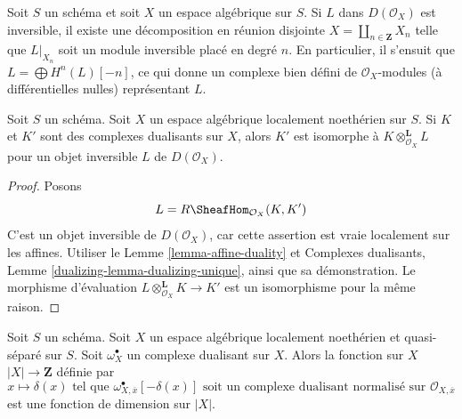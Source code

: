 \medskip\noindent
Soit $S$ un schéma et soit $X$ un espace algébrique sur $S$.
Si $L$ dans $D(\mathcal{O}_X)$ est inversible, il existe une
décomposition en réunion disjointe $X = \coprod_{n \in \mathbf{Z}} X_n$
telle que $L|_{X_n}$ soit un module inversible placé en degré $n$.
En particulier, il s'ensuit que $L = \bigoplus H^n(L)[-n]$,
ce qui donne un complexe bien défini de $\mathcal{O}_X$-modules
(à différentielles nulles) représentant $L$.

\begin{lemma}
\label{lemma-dualizing-unique-spaces}
Soit $S$ un schéma.
Soit $X$ un espace algébrique localement noethérien sur $S$.
Si $K$ et $K'$ sont des complexes dualisants sur $X$, alors $K'$
est isomorphe à $K \otimes_{\mathcal{O}_X}^\mathbf{L} L$
pour un objet inversible $L$ de $D(\mathcal{O}_X)$.
\end{lemma}

\begin{proof}
Posons
$$
L = R\SheafHom_{\mathcal{O}_X}(K, K')
$$
C'est un objet inversible de $D(\mathcal{O}_X)$, car cette assertion est vraie
localement sur les affines. Utiliser le Lemme \ref{lemma-affine-duality} et
Complexes dualisants, Lemme
\ref{dualizing-lemma-dualizing-unique}, ainsi que sa démonstration.
Le morphisme d'évaluation $L \otimes_{\mathcal{O}_X}^\mathbf{L} K \to K'$
est un isomorphisme pour la même raison.
\end{proof}

\begin{lemma}
\label{lemma-dimension-function-scheme}
Soit $S$ un schéma. Soit $X$ un espace algébrique localement noethérien
et quasi-séparé sur $S$.
Soit $\omega_X^\bullet$ un complexe dualisant sur $X$. Alors la fonction sur $X$
$|X| \to \mathbf{Z}$ définie par
$$
x \longmapsto \delta(x)\text{ tel que }
\omega_{X, \overline{x}}^\bullet[-\delta(x)]
\text{ soit un complexe dualisant normalisé sur }
\mathcal{O}_{X, \overline{x}}
$$
est une fonction de dimension sur $|X|$.
\end{lemma}

